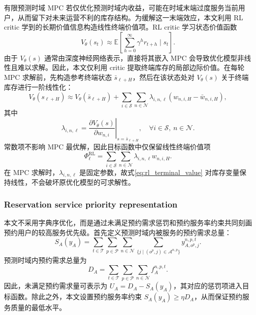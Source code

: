 \documentclass[12pt,hyperref,a4paper,UTF8]{ctexart}
\begin{document}
有限预测时域 MPC 若仅优化预测时域内收益，可能在时域末端过度服务当前用户，从而留下对未来运营不利的库存结构。为缓解这一末端效应，本文利用 RL critic 学到的长期价值信息构造线性终端价值项。RL critic 学习状态价值函数
\begin{equation}
V_{\theta}(s_t)\approx
\mathbb{E}\left[\sum_{h=0}^{\infty}\gamma^h r_{t+h}\mid s_t\right].
\label{eq:critic_value}
\end{equation}
由于 $V_{\theta}(s)$ 通常由深度神经网络表示，直接将其嵌入 MPC 会导致优化模型非线性且难以求解。因此，本文仅利用 critic 提取终端库存的局部边际价值。在每轮 MPC 求解前，先构造参考终端状态 $\bar{s}_{\ell+H}$，然后在该状态处对 $V_{\theta}(s)$ 关于终端库存进行一阶线性化：
\begin{equation}
V_{\theta}(s_{\ell+H})
\approx
V_{\theta}(\bar{s}_{\ell+H})+
\sum_{i\in\mathcal{S}}\sum_{n\in\mathcal{N}}
\lambda_{i,n,\ell}\left(w_{n,i,H}-\bar{w}_{n,i,H}\right),
\label{eq:value_linearization}
\end{equation}
其中
\begin{equation}
\lambda_{i,n,\ell}
=
\left.
\frac{\partial V_{\theta}(s)}{\partial w_{n,i}}
\right|_{s=\bar{s}_{\ell+H}},
\quad \forall i\in\mathcal{S},\ n\in\mathcal{N}.
\label{eq:marginal_value}
\end{equation}
常数项不影响 MPC 最优解，因此目标函数中仅保留线性终端价值项
\begin{equation}
\Phi^{\mathrm{RL}}_{\ell}
=
\sum_{i\in\mathcal{S}}\sum_{n\in\mathcal{N}}
\lambda_{i,n,\ell}w_{n,i,H}.
\label{eq:rl_terminal_value}
\end{equation}
在 MPC 求解时，$\lambda_{i,n,\ell}$ 是固定参数，故式\eqref{eq:rl_terminal_value} 对库存变量保持线性，不会破坏原优化模型的可求解性。


\subsubsection{Reservation service priority representation}

本文不采用字典序优化，而是通过未满足预约需求惩罚和预约服务率约束共同刻画预约用户的较高服务优先级。首先定义预测时域内被服务的预约需求总量：
\begin{equation}
S_A(y_A)=
\sum_{t\in\mathcal{T}}\sum_{p\in\mathcal{P}}\sum_{n\in\mathcal{N}}
\sum_{\{j\mid (o^p,j)\in\mathcal{A}^{n,p}\}}
y_{A,o^p,j}^{n,p,t}.
\label{eq:served_reservation_total}
\end{equation}
预测时域内预约需求总量为
\begin{equation}
D_A=
\sum_{t\in\mathcal{T}}\sum_{p\in\mathcal{P}}\sum_{n\in\mathcal{N}}
f_A^{n,p,t}.
\label{eq:reservation_total_demand}
\end{equation}
因此，未满足预约需求量可表示为 $U_A=D_A-S_A(y_A)$，其对应的惩罚项进入目标函数。除此之外，本文设置预约服务率约束 $S_A(y_A)\ge \eta D_A$，从而保证预约服务质量的最低水平。
\end{document}
